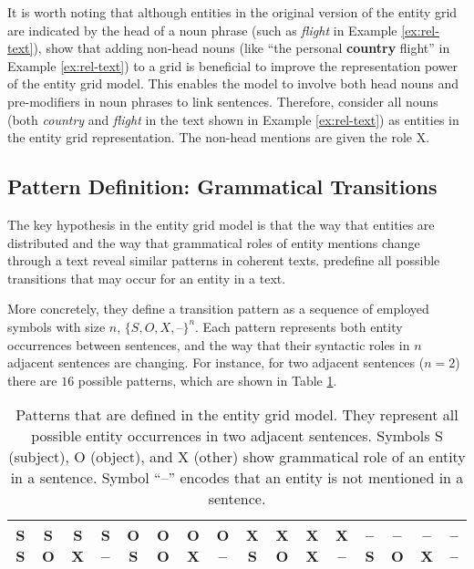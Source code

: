 It is worth noting that although entities in the original version of the entity grid are indicated by the head of a noun phrase (such as \emph{flight} in Example \ref{ex:rel-text}),  show that adding non-head nouns (like ``the personal \textbf{country} flight'' in Example \ref{ex:rel-text}) to a grid is beneficial to improve the representation power of the entity grid model. 
This enables the model to involve both head nouns and pre-modifiers in noun phrases to link sentences. 
Therefore,  consider all nouns (both \emph{country} and \emph{flight} in the text shown in Example \ref{ex:rel-text}) as entities in the entity grid representation.  
The non-head mentions are given the role X. 

\subsection{Pattern Definition: Grammatical Transitions}

The key hypothesis in the entity grid model is that the way that entities are distributed and the way that grammatical roles of entity mentions change through a text reveal similar patterns in coherent texts.  
 predefine all possible transitions that may occur for an entity in a text. 

More concretely, they define a transition pattern as a sequence of employed symbols with size $n$, $\{ S,O,X,\textit{--} \}^n$. 
Each pattern represents both entity occurrences between sentences, and the way that their syntactic roles in $n$ adjacent sentences are changing. 
For instance, for two adjacent sentences ($n=2$) there are $16$ possible patterns, which are shown in Table \ref{table:rel-egrid-pattern}.

\begin{table}[!ht]
	\begin{center}
		\resizebox{\columnwidth}{!}
		{%
			\begin{tabular}{@{}cccccccccccccccc@{}}
			\hline
			S S & S O & S X & S -- & 
			O S & O O & O X & O -- & 
			X S & X O & X X & X -- & 
			-- S & -- O & -- X & -- -- 
			\\\hline
			\end{tabular}
		}%
	\end{center}
	\caption{Patterns that are defined in the entity grid model.  
	They represent all possible entity occurrences in two adjacent sentences. 
	Symbols S (subject), O (object), and X (other) show grammatical role of an entity in a sentence. Symbol ``--'' encodes that an entity is not mentioned in a sentence.}
	\label{table:rel-egrid-pattern}
\end{table}

